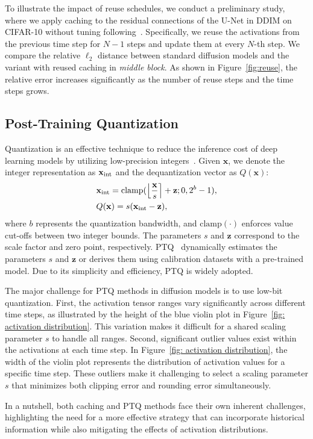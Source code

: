 To illustrate the impact of reuse schedules, we conduct a preliminary study, where we apply caching to the residual connections of the U-Net in DDIM on CIFAR-10 without tuning following~\citet{ma2024deepcache}. Specifically, we reuse the activations from the previous time step for $N-1$ steps and update them at every $N$-th step. We compare the relative \( \ell_2 \) distance between standard diffusion models and the variant with reused caching in \textit{middle block}. As shown in Figure~\ref{fig:reuse}, the relative error increases significantly as the number of reuse steps and the time steps grows. 

\subsection{Post-Training Quantization}
Quantization is an effective technique to reduce the inference cost of deep learning models by utilizing low-precision integers~\citep{nagel2021white}. Given \(\mathbf{x}\), we denote the integer representation as \({\mathbf{x}}_\text{int}\) and the dequantization vector as \(Q(\mathbf{x})\):
\begin{align}
    & {\mathbf{x}}_{\text{int}} = \text{clamp}(\left\lfloor\frac{{\mathbf{x}}}{s}\right\rceil + {\mathbf{z}}; 0, 2^b-1), \\
    & Q({\mathbf{x}}) = s({\mathbf{x}}_{\text{int}}-{\mathbf{z}}),
\end{align}
where \(b\) represents the quantization bandwidth, and \(\text{clamp}(\cdot)\) enforces value cut-offs between two integer bounds. The parameters \(s\) and \(\mathbf{z}\) correspond to the scale factor and zero point, respectively. PTQ~\citep{shang2023post} dynamically estimates the parameters \(s\) and \(\mathbf{z}\) or derives them using calibration datasets with a pre-trained model. Due to its simplicity and efficiency, PTQ is widely adopted.

The major challenge for PTQ methods in diffusion models is to use low-bit quantization. First, the activation tensor ranges vary significantly across different time steps, as illustrated by the height of the blue violin plot in Figure~\ref{fig: activation distribution}. This variation makes it difficult for a shared scaling parameter \(s\) to handle all ranges. Second, significant outlier values exist within the activations at each time step. In Figure~\ref{fig: activation distribution}, the width of the violin plot represents the distribution of activation values for a specific time step. These outliers make it challenging to select a scaling parameter \(s\) that minimizes both clipping error and rounding error simultaneously.

In a nutshell, both caching and PTQ methods face their own inherent challenges, highlighting the need for a more effective strategy that can incorporate historical information while also mitigating the effects of activation distributions.

